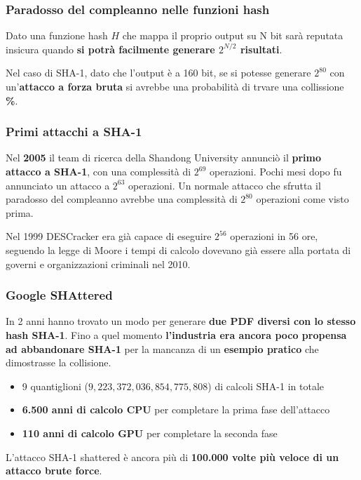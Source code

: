\begin{frame}
	\frametitle{Paradosso del compleanno nelle funzioni hash}

	Dato una funzione hash \(H\) che mappa il proprio output su N bit sarà reputata insicura quando \textbf{si potrà facilmente generare $2^{N/2}$ risultati}.

	\vspace{1cm}

	Nel caso di SHA-1, dato che l'output è a 160 bit, se si potesse generare $2^{80}$ con un'\textbf{attacco a forza bruta} si avrebbe una probabilità di trvare una collissione \textbf{\%}.
\end{frame}


\begin{frame}
	\frametitle{Primi attacchi a SHA-1}
	Nel \textbf{2005} il team di ricerca della Shandong University annunciò il \textbf{primo attacco a SHA-1}, con una complessità di \(2^{69}\) operazioni.
	Pochi mesi dopo fu annunciato un attacco a \(2^{63}\) operazioni.
	Un normale attacco che sfrutta il paradosso del compleanno avrebbe una complessità di \(2^{80}\) operazioni come visto prima.

	\vspace{1cm}

	Nel 1999 DESCracker era già capace di eseguire \(2^{56}\) operazioni in 56 ore, seguendo la legge di Moore i tempi di calcolo dovevano già essere alla portata di governi e organizzazioni criminali nel 2010.
\end{frame}


\begin{frame}
	\frametitle{Google SHAttered}

	In 2 anni hanno trovato un modo per generare \textbf{due PDF diversi con lo stesso hash SHA-1}.
	Fino a quel momento \textbf{l'industria era ancora poco propensa ad abbandonare SHA-1} per la mancanza di un \textbf{esempio pratico} che dimostrasse la collisione.
	\begin{itemize}
		\item 9 quantiglioni (\(9,223,372,036,854,775,808\)) di calcoli SHA-1 in totale
		\item \textbf{6.500 anni di calcolo CPU} per completare la prima fase dell'attacco
		\item \textbf{110 anni di calcolo GPU} per completare la seconda fase
	\end{itemize}

	L'attacco SHA-1 shattered è ancora più di \textbf{100.000 volte più veloce di un attacco brute force}.
\end{frame}


